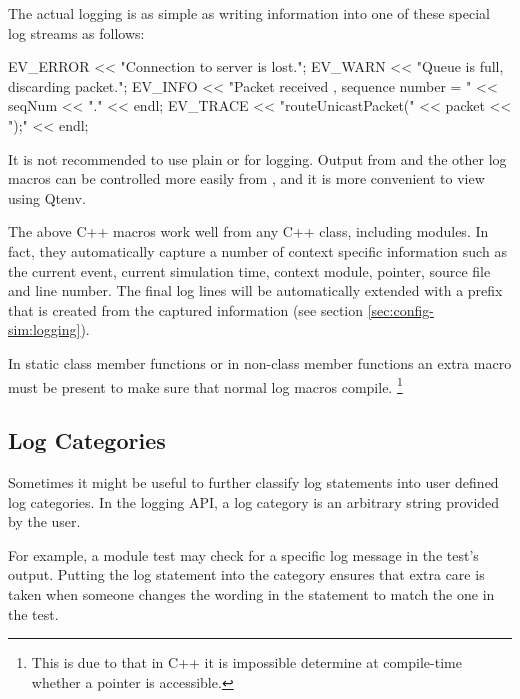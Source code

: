 The actual logging is as simple as writing information into one of these special
log streams as follows:

\begin{cpp}
EV_ERROR << "Connection to server is lost.\n";
EV_WARN << "Queue is full, discarding packet.\n";
EV_INFO << "Packet received , sequence number = " << seqNum << "." << endl;
EV_TRACE << "routeUnicastPacket(" << packet << ");" << endl;
\end{cpp}

\begin{note}
It is not recommended to use plain  or  for
logging. Output from  and the other log macros can be controlled
more easily from , and it is more convenient to view
using Qtenv.
\end{note}

The above C++ macros work well from any C++ class, including {\opp} modules. In
fact, they automatically capture a number of context specific information such
as the current event, current simulation time, context module, 
pointer, source file and line number. The final log lines will be automatically
extended with a prefix that is created from the captured information (see
section \ref{sec:config-sim:logging}).

In static class member functions or in non-class member functions an extra
 macro must be present to make sure that normal log
macros compile. \footnote{This is due to that in C++ it is impossible
determine at compile-time whether a  pointer is accessible.}

\begin{cpp}
void findModule(const char *name, cModule *from)
{
    EV_STATICCONTEXT;
    EV_TRACE << "findModule(" << name << ", " << from << ");" << endl;
\end{cpp}

\subsection{Log Categories}
\label{sec:sim-lib:log-categories}

Sometimes it might be useful to further classify log statements into user
defined log categories. In the {\opp} logging API, a log category is an
arbitrary string provided by the user.

For example, a module test may check for a specific log message in the test's
output. Putting the log statement into the  category ensures that
extra care is taken when someone changes the wording in the statement to match
the one in the test.

